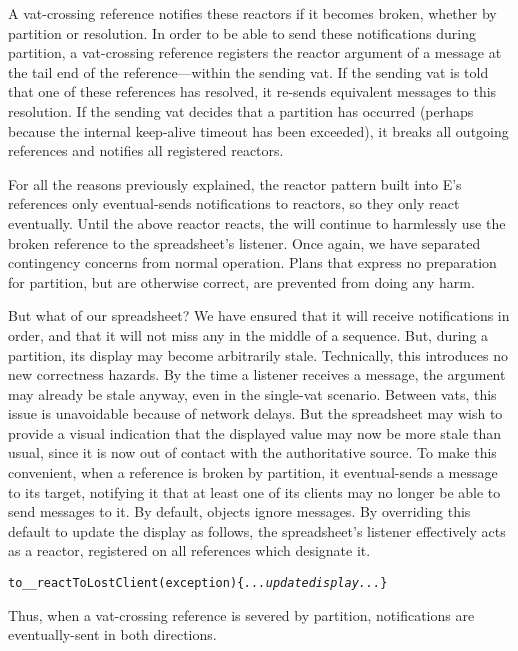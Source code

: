 \documentclass{llncs}
\begin{document}
A vat-crossing reference notifies these reactors if it becomes broken,
whether by partition or resolution. In order to be able to send these
notifications during partition, a vat-crossing reference registers the
reactor argument of a  message at the tail end of
the reference---within the sending vat. If the sending vat is told
that one of these references has resolved, it re-sends equivalent
 messages to this resolution. If the sending vat
decides that a partition has occurred (perhaps because the internal
keep-alive timeout has been exceeded), it breaks all outgoing
references and notifies all registered reactors.

For all the reasons previously explained, the reactor pattern built
into E's references only eventual-sends notifications to reactors, so
they only react eventually. Until the above reactor reacts, the
 will continue to harmlessly use the broken
reference to the spreadsheet's listener. Once again, we have separated
contingency concerns from normal operation. Plans that express no
preparation for partition, but are otherwise correct, are prevented
from doing any harm.

But what of our spreadsheet? We have ensured that it will receive
 notifications in order, and that it will not miss
any in the middle of a sequence. But, during a partition, its display
may become arbitrarily stale. Technically, this introduces no new
correctness hazards. By the time a listener receives a
 message, the  argument may already
be stale anyway, even in the single-vat scenario. Between vats, this
issue is unavoidable because of network delays. But the spreadsheet
may wish to provide a visual indication that the displayed value may
now be more stale than usual, since it is now out of contact with the
authoritative source. To make this convenient, when a reference is
broken by partition, it eventual-sends a 
message to its target, notifying it that at least one of its clients
may no longer be able to send messages to it. By default, objects
ignore  messages. By overriding this
default to update the display as follows, the spreadsheet's listener
effectively acts as a reactor, registered on all references which
designate it.
%
\begin{alltt}
    to \_\_reactToLostClient(exception) \{ {\it ...update display...} \}
\end{alltt}
%
Thus, when a vat-crossing reference is severed by partition,
notifications are eventually-sent in both directions.
\end{document}
